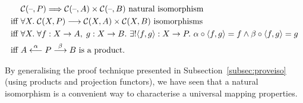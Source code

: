 \begin{align*}
    & \lscat C (\phold, P) \natarrow \lscat C (\phold, A) \times \lscat C (\phold, B) \textrm{ natural isomorphism}\\
    \textrm{iff  } & \forall X.\;\lscat C (X, P) \morpharrow \lscat C (X, A) \times \lscat C (X, B)
                        \textrm{ isomorphisms}\\
    \textrm{iff  } & \forall X.\;\forall f: X \to A,\;g : X \to B.\ 
                        \exists! \langle f, g \rangle : X \to P.\ 
                        \alpha \comp \langle f, g \rangle = f \wedge
                        \beta \comp \langle f, g \rangle = g \\
    \textrm{iff  } & A \overset{\alpha}{\longleftarrow} P \morpharr{\beta} B \textrm{ is a product.}
\end{align*}

By generalising the proof technique presented in
Subsection~\ref{subsec:proveiso} (using products and projection functors), we
have seen that a natural isomorphism is a convenient way to characterise a
universal mapping properties.
